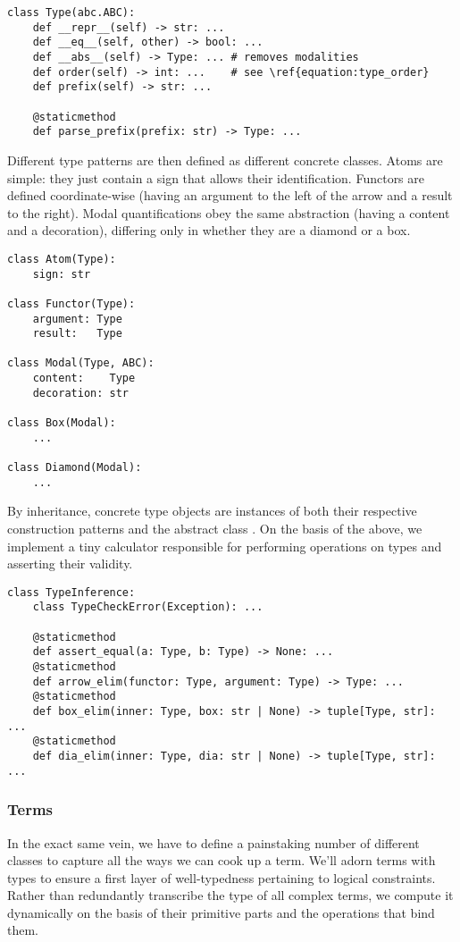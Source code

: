 \begin{verbatim}
class Type(abc.ABC): 
	def __repr__(self) -> str: ...
	def __eq__(self, other) -> bool: ...
	def __abs__(self) -> Type: ... # removes modalities
	def order(self) -> int: ...    # see \ref{equation:type_order}
	def prefix(self) -> str: ...  
	
	@staticmethod
	def parse_prefix(prefix: str) -> Type: ...  
\end{verbatim}

\noindent Different type patterns are then defined as different concrete classes.
Atoms are simple: they just contain a sign that allows their identification.
Functors are defined coordinate-wise (having an argument to the left of the arrow and a result to the right).
Modal quantifications obey the same abstraction (having a content and a decoration), differing only in whether they are a diamond or a box.

\begin{verbatim}
class Atom(Type):
	sign: str

class Functor(Type):
	argument: Type
	result:   Type
	
class Modal(Type, ABC):
	content:    Type
	decoration: str
	
class Box(Modal):
	...
	
class Diamond(Modal):
	...
\end{verbatim}

\noindent By inheritance, concrete type objects are instances of both their respective construction patterns and the abstract class .
On the basis of the above, we implement a tiny calculator responsible for performing operations on types and asserting their validity.

\begin{verbatim}
class TypeInference:
    class TypeCheckError(Exception): ...

    @staticmethod
    def assert_equal(a: Type, b: Type) -> None: ...
    @staticmethod
    def arrow_elim(functor: Type, argument: Type) -> Type: ...
    @staticmethod
    def box_elim(inner: Type, box: str | None) -> tuple[Type, str]: ...
    @staticmethod
    def dia_elim(inner: Type, dia: str | None) -> tuple[Type, str]: ...
\end{verbatim}

\subsubsection{Terms}
In the exact same vein, we have to define a painstaking number of different classes to capture all the ways we can cook up a term.
We'll adorn terms with types to ensure a first layer of well-typedness pertaining to logical constraints.
Rather than redundantly transcribe the type of all complex terms, we compute it dynamically on the basis of their primitive parts and the operations that bind them.

